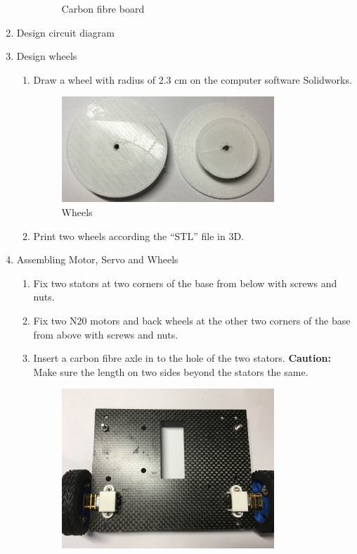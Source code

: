 \begin{enumerate}
\begin{enumerate}
\begin{figure}[H]
\begin{center}
	\end{center}
 	\caption{Carbon fibre board \label{fig:carbonFiberBoard}}
	\end{figure}
	\end{enumerate}
\item Design circuit diagram 
\item Design wheels
	\begin{enumerate}
	\item Draw a wheel with radius of 2.3 cm on the computer software Solidworks.\\
	\begin{figure}[H]
	\begin{center}
	\includegraphics[width=8cm]{figure/procedure/p3}
	\end{center}
 	\caption{Wheels \label{fig:wheels}}
	\end{figure}
	\item Print two wheels according the ``STL'' file in 3D.
	\end{enumerate}
\item Assembling Motor, Servo and Wheels
	\begin{enumerate}
	\item Fix two stators at two corners of the base from below with screws and nuts. 
	\item Fix two N20 motors and back wheels at the other two corners of the base from above with screws and nuts.
	\item Insert a carbon fibre axle in to the hole of the two stators. \textbf{Caution:} Make sure the length on two sides beyond the stators the same. \\
	\begin{figure}[H]
	\begin{center}
	\includegraphics[width=8cm]{figure/procedure/p4}

\end{center}
\end{figure}
\end{enumerate}
\end{enumerate}
